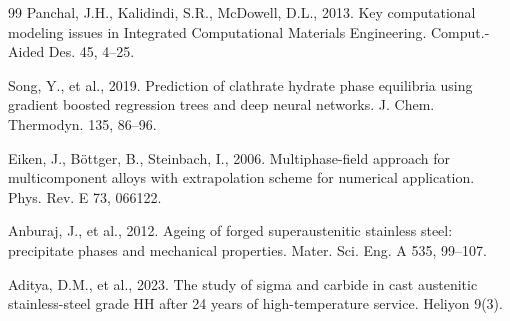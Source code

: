 \documentclass[preprint,12pt,authoryear]{elsarticle}
\begin{document}
\begin{thebibliography}{99}
Panchal, J.H., Kalidindi, S.R., McDowell, D.L., 2013. Key computational
modeling issues in Integrated Computational Materials Engineering.
Comput.-Aided Des. 45, 4--25.

Song, Y., et al., 2019. Prediction of clathrate hydrate phase equilibria
using gradient boosted regression trees and deep neural networks. J. Chem.
Thermodyn. 135, 86--96.

Eiken, J., B\"ottger, B., Steinbach, I., 2006. Multiphase-field approach
for multicomponent alloys with extrapolation scheme for numerical
application. Phys. Rev. E 73, 066122.

Anburaj, J., et al., 2012. Ageing of forged superaustenitic stainless
steel: precipitate phases and mechanical properties. Mater. Sci. Eng. A
535, 99--107.

Aditya, D.M., et al., 2023. The study of sigma and carbide in cast
austenitic stainless-steel grade HH after 24 years of high-temperature
service. Heliyon 9(3).

\end{thebibliography}
\end{document}
